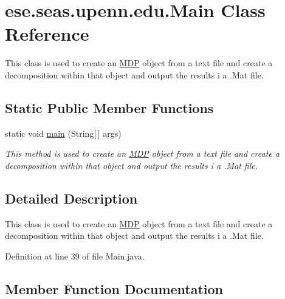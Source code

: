 \hypertarget{classese_1_1seas_1_1upenn_1_1edu_1_1_main}{}\section{ese.\+seas.\+upenn.\+edu.\+Main Class Reference}
\label{classese_1_1seas_1_1upenn_1_1edu_1_1_main}


This class is used to create an \hyperlink{classese_1_1seas_1_1upenn_1_1edu_1_1_m_d_p}{M\+D\+P} object from a text file and create a decomposition within that object and output the results i a .Mat file.  


\subsection*{Static Public Member Functions}
\begin{DoxyCompactItemize}
\item 
static void \hyperlink{classese_1_1seas_1_1upenn_1_1edu_1_1_main_a88eabca25558235b5b46c105c11ca794}{main} (String\mbox{[}$\,$\mbox{]} args)
\begin{DoxyCompactList}\small\item\em This method is used to create an \hyperlink{classese_1_1seas_1_1upenn_1_1edu_1_1_m_d_p}{M\+D\+P} object from a text file and create a decomposition within that object and output the results i a .Mat file. \end{DoxyCompactList}\end{DoxyCompactItemize}


\subsection{Detailed Description}
This class is used to create an \hyperlink{classese_1_1seas_1_1upenn_1_1edu_1_1_m_d_p}{M\+D\+P} object from a text file and create a decomposition within that object and output the results i a .Mat file. 

Definition at line 39 of file Main.\+java.



\subsection{Member Function Documentation}
\hypertarget{classese_1_1seas_1_1upenn_1_1edu_1_1_main_a88eabca25558235b5b46c105c11ca794}{}
